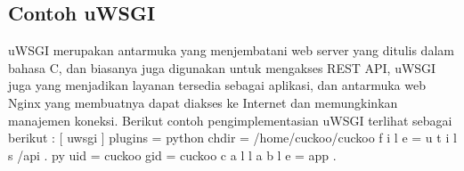 \subsection {Contoh uWSGI}
uWSGI merupakan antarmuka yang menjembatani web server yang ditulis dalam bahasa C, dan biasanya juga digunakan untuk mengakses REST API, uWSGI juga yang menjadikan layanan tersedia sebagai aplikasi, dan antarmuka web Nginx yang membuatnya dapat diakses ke Internet dan memungkinkan manajemen koneksi. Berikut contoh pengimplementasian uWSGI terlihat
sebagai berikut :
[ uwsgi ]
plugins = python
chdir = /home/cuckoo/cuckoo
f i l e = u t i l s /api . py
uid = cuckoo
gid = cuckoo
c a l l a b l e = app
\cite{beran2017analyza}.





